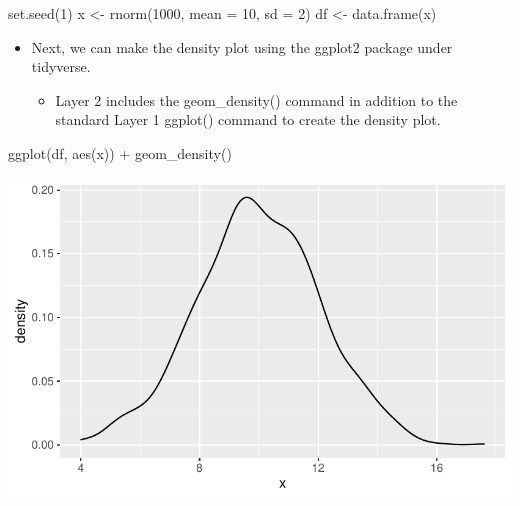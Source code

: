 \documentclass[
  letterpaper,
  DIV=11,
  numbers=noendperiod]{scrreprt}
\newenvironment{Shaded}{\begin{snugshade}}{\end{snugshade}}
\newcommand{\AttributeTok}[1]{\textcolor[rgb]{0.40,0.45,0.13}{#1}}
\newcommand{\DecValTok}[1]{\textcolor[rgb]{0.68,0.00,0.00}{#1}}
\newcommand{\FunctionTok}[1]{\textcolor[rgb]{0.28,0.35,0.67}{#1}}
\newcommand{\NormalTok}[1]{\textcolor[rgb]{0.00,0.23,0.31}{#1}}
\newcommand{\OtherTok}[1]{\textcolor[rgb]{0.00,0.23,0.31}{#1}}
\newcommand{\SpecialCharTok}[1]{\textcolor[rgb]{0.37,0.37,0.37}{#1}}
\providecommand{\tightlist}{%
  \setlength{\itemsep}{0pt}\setlength{\parskip}{0pt}}\usepackage{longtable,booktabs,array}
\begin{document}
\begin{Shaded}
\begin{Highlighting}[]
\FunctionTok{set.seed}\NormalTok{(}\DecValTok{1}\NormalTok{)}
\NormalTok{x }\OtherTok{\textless{}{-}} \FunctionTok{rnorm}\NormalTok{(}\DecValTok{1000}\NormalTok{, }\AttributeTok{mean =} \DecValTok{10}\NormalTok{, }\AttributeTok{sd =} \DecValTok{2}\NormalTok{)}
\NormalTok{df }\OtherTok{\textless{}{-}} \FunctionTok{data.frame}\NormalTok{(x)}
\end{Highlighting}
\end{Shaded}

\begin{itemize}
\tightlist
\item
  Next, we can make the density plot using the ggplot2 package under
  tidyverse.

  \begin{itemize}
  \tightlist
  \item
    Layer 2 includes the geom\_density() command in addition to the
    standard Layer 1 ggplot() command to create the density plot.
  \end{itemize}
\end{itemize}

\begin{Shaded}
\begin{Highlighting}[]
\FunctionTok{ggplot}\NormalTok{(df, }\FunctionTok{aes}\NormalTok{(x)) }\SpecialCharTok{+} \FunctionTok{geom\_density}\NormalTok{()}
\end{Highlighting}
\end{Shaded}

\includegraphics{dataviz_files/figure-pdf/unnamed-chunk-21-1.pdf}
\end{document}

